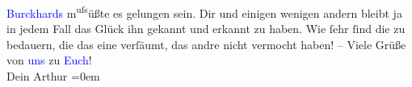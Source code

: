                   \textcolor{blue}{Burckhards}{}\ledrightnote{\textcolor{blue}{Max Eugen Burckhard}} m\substVorne{}\textsuperscript{uſs}\substDazwischen{}üßte\substHinten{} es gelungen sein. Dir und einigen wenigen andern bleibt ja in jedem Fall das
               Glück ihn gekannt und erkannt zu haben. Wie ſehr ſind die zu bedauern, die das eine
               verſäumt, das andre nicht vermocht haben! –\pend
           \pstart
           Viele Grüße von \textcolor{blue}{uns}{} zu \textcolor{blue}{Euch}{}!{\\[\baselineskip]}Dein
                  \spacefill\mbox{Arthur}\pend
           \leftskip=0em{}\endnumbering{}  
      